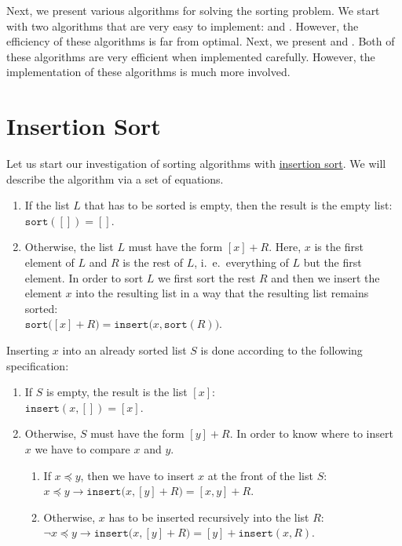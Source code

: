 Next, we present various algorithms for solving the sorting problem.  We start with two algorithms
that are very easy to implement:  and .  However, the
efficiency of these algorithms is far from optimal.  Next, we present  and 
.  Both of these algorithms are very efficient when implemented carefully.
However, the implementation of these algorithms is much more involved.


\section{Insertion Sort}
Let us start our investigation of sorting algorithms with
\href{http://en.wikipedia.org/wiki/Insertion_sort}{insertion sort}.  We will describe the
algorithm via a set of equations.
\begin{enumerate}
\item If the list $L$ that has to be sorted is empty, then the result is the empty list: 
      \\[0.2cm]
      \hspace*{1.3cm}
      $\mathtt{sort}([]) = []$.
\item Otherwise, the list $L$ must have the form $[x] + R$. Here, $x$ is the first element of $L$
      and $R$ is the rest of $L$, i.~e.~everything of $L$ but the first element.  In order to sort
      $L$ we first sort the rest $R$ and then we insert the element $x$ into the resulting list in a
      way that the resulting list remains sorted:
      \\[0.2cm]
      \hspace*{1.3cm} $\mathtt{sort}\bigl([x] + R\bigr) = \mathtt{insert}\bigl(x, \mathtt{sort}(R)\bigr)$.
\end{enumerate}
Inserting $x$ into an already sorted list $S$ is done according to the following specification:
\begin{enumerate}
\item If $S$ is empty, the result is the list $[x]$: \\[0.2cm]
      \hspace*{1.3cm}
      $\mathtt{insert}(x,[]) = [x]$.
\item Otherwise, $S$ must have the form $[y] + R$.  In order to know where to insert $x$ we have to
      compare $x$ and $y$.
      \begin{enumerate}
      \item If $x \preceq y$, then we have to insert $x$ at the front of the list $S$: \\[0.2cm]
            \hspace*{1.3cm}
            $x \preceq y \rightarrow \mathtt{insert}\bigl(x, [y] + R\bigr) = [x,y] + R$. 
      \item Otherwise, $x$ has to be inserted recursively into the list $R$: \\[0.2cm]
            \hspace*{1.3cm}
            $\neg x \preceq y \rightarrow \mathtt{insert}\bigl(x, [y] + R\bigr) = [y] + \mathtt{insert}(x,R)$. 
      \end{enumerate}
\end{enumerate}

